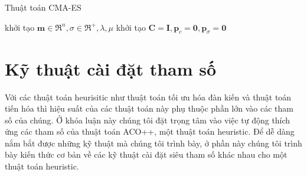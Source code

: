 \begin{algorithm}
\caption{Thuật toán CMA-ES}
\label{algo:CMAES}
khởi tạo $\mathbf{m} \in \Re^n, \sigma \in \Re^{+}, \lambda, \mu$ \; \label{CMAES-algo:step1}
khởi tạo $\mathbf{C}=\mathbf{I}, \mathbf{p}_c=\mathbf{0}, \mathbf{p}_\sigma=\mathbf{0}$ \;\label{CMAES-algo:step2}
\label{CMAES-algo:step11}
\end{algorithm}

\section{Kỹ thuật cài đặt tham số}\label{section:parametersetting}
Với các thuật toán heurisitic như thuật toán tối ưu hóa đàn kiến và thuật toán tiến hóa thì hiệu suất của các thuật toán này phụ thuộc phần lớn vào các tham số của chúng. Ở khóa luận này chúng tôi đặt trọng tâm vào việc tự động thích ứng các tham số của thuật toán ACO++, một thuật toán heuristic. Để dễ dàng nắm bắt được những kỹ thuật mà chúng tôi trình bày, ở phần này chúng tôi trình bày kiến thức cơ bản về các kỹ thuật cài đặt siêu tham số khác nhau cho một thuật toán heuristic.

